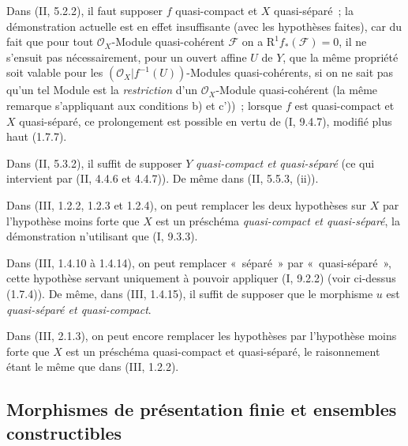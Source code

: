 \begin{env}[1.7.18]
\label{IV.1.7.18-fr}
Dans (II, 5.2.2), il faut supposer $f$ quasi-compact et $X$ quasi-séparé~; la
démonstration actuelle est en effet insuffisante (avec les hypothèses faites),
car du fait que pour tout $\mathcal O_X$-Module quasi-cohérent $\mathcal F$ on
a $\mathrm R^1f_*(\mathcal F)=0$, il ne s'ensuit pas nécessairement, pour un
ouvert affine $U$ de $Y$, que la même propriété soit valable pour les
$(\mathcal O_X|f^{-1}(U))$-Modules quasi-cohérents, si on ne sait pas qu'un tel
Module est la \emph{restriction} d'un $\mathcal O_X$-Module quasi-cohérent (la
même remarque s'appliquant aux conditions b) et c'))~; lorsque $f$ est
quasi-compact et $X$ quasi-séparé, ce prolongement est possible en vertu de
(I, 9.4.7), modifié plus haut (1.7.7).
\end{env}

\begin{env}[1.7.19]
\label{IV.1.7.19-fr}
Dans (II, 5.3.2), il suffit de supposer $Y$ \emph{quasi-compact et
quasi-séparé} (ce qui intervient par (II, 4.4.6 et 4.4.7)). De même dans (II,
5.5.3, (ii)).
\end{env}

\begin{env}[1.7.20]
\label{IV.1.7.20-fr}
Dans (III, 1.2.2, 1.2.3 et 1.2.4), on peut remplacer les deux hypothèses sur
$X$ par l'hypothèse moins forte que $X$ est un préschéma \emph{quasi-compact
et quasi-séparé}, la démonstration n'utilisant que (I, 9.3.3).
\end{env}

\begin{env}[1.7.21]
\label{IV.1.7.21-fr}
Dans (III, 1.4.10 à 1.4.14), on peut remplacer «~séparé~» par
«~quasi-séparé~», cette hypothèse servant uniquement à pouvoir appliquer (I,
9.2.2) (voir ci-dessus (1.7.4)). De même, dans (III, 1.4.15), il suffit de
supposer que le morphisme $u$ est \emph{quasi-séparé et quasi-compact}.
\end{env}

\begin{env}[1.7.22]
\label{IV.1.7.22-fr}
Dans (III, 2.1.3), on peut encore remplacer les hypothèses par l'hypothèse
moins forte que $X$ est un préschéma quasi-compact et quasi-séparé, le
raisonnement étant le même que dans (III, 1.2.2).
\end{env}

\subsection{Morphismes de présentation finie et ensembles constructibles}
\label{subsection:IV.1.8-fr}

